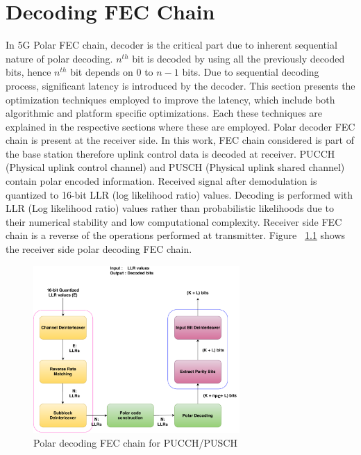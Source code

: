\chapter{Decoding FEC Chain} \label{chap:DecodingChain}
In 5G Polar FEC chain, decoder is the critical part due to inherent sequential nature of polar decoding. $n^{th}$ bit is decoded by using all the previously decoded bits, hence $n^{th}$ bit depends on $0$ to $n-1$ bits. Due to sequential decoding process, significant latency is introduced by the decoder. This section presents the optimization techniques employed to improve the latency, which include both algorithmic and platform specific optimizations. Each these techniques are explained in the respective sections where these are employed. Polar decoder FEC chain is present at the receiver side. In this work, FEC chain considered is part of the base station therefore uplink control data is decoded at receiver. PUCCH (Physical uplink control channel) and PUSCH (Physical uplink shared channel) contain polar encoded information. Received signal after demodulation is quantized to 16-bit LLR (log likelihood ratio) values. Decoding is performed with LLR (Log likelihood ratio) values rather than probabilistic likelihoods due to their numerical stability and low computational complexity. Receiver side FEC chain is a reverse of the operations performed at transmitter. Figure ~\ref{fig:5grx_fec_chain} shows the receiver side polar decoding FEC chain.
\begin{figure}[]
	\centering
	\includegraphics[width=0.7\textwidth]{./figures/receiverFECChain.pdf}
	\caption{Polar decoding FEC chain for PUCCH/PUSCH}
	\label{fig:5grx_fec_chain}
\end{figure}
